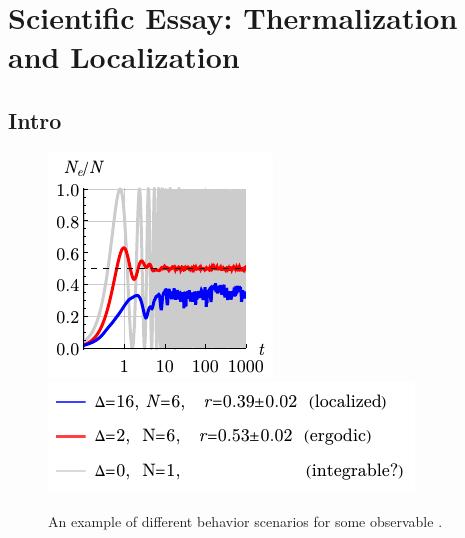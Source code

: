 \setcounter{section}{9}
\setcounter{subsection}{0}


\section*{Scientific Essay: Thermalization and Localization}




\subsection{Intro}




\begin{figure}[h]
    \centering
    \hspace{10 mm} 
    \includegraphics[align=c]{imgs/lo2.pdf}
    \hspace{1 mm} 
    \includegraphics[align=c]{imgs/lo2l.pdf}
    \caption{
    An example of different behavior scenarios for some observable
    .
    }
    \label{fig:BASE}
\end{figure}








